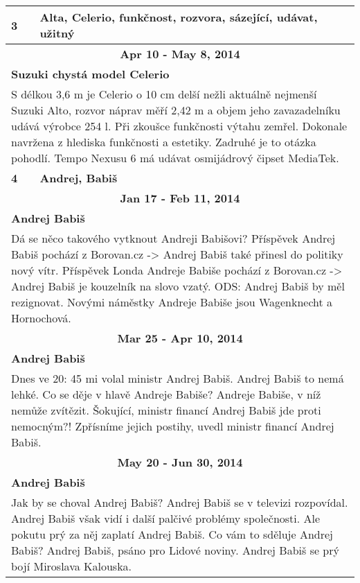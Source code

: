\begin{tabularx}{\linewidth}{l l}
            \bf 3 & \bf Alta, Celerio, funkčnost, rozvora, sázející, udávat, užitný \\ \midrule
            
                \multicolumn{2}{c}{\bf Apr 10 - May 8, 2014} \\
                \multicolumn{2}{p{\linewidth}}{\bf Suzuki chystá model Celerio} \\
                \multicolumn{2}{p{\linewidth}}{S délkou 3,6 m je Celerio o 10 cm delší nežli aktuálně nejmenší Suzuki Alto, rozvor náprav měří 2,42 m a objem jeho zavazadelníku udává výrobce 254 l. Při zkoušce funkčnosti výtahu zemřel. Dokonale navržena z hlediska funkčnosti a estetiky. Zadruhé je to otázka pohodlí. Tempo Nexusu 6 má udávat osmijádrový čipset MediaTek.} \\ \midrule
                [1.5pt]

            \bf 4 & \bf Andrej, Babiš \\ \midrule
            
                \multicolumn{2}{c}{\bf Jan 17 - Feb 11, 2014} \\
                \multicolumn{2}{p{\linewidth}}{\bf Andrej Babiš} \\
                \multicolumn{2}{p{\linewidth}}{Dá se něco takového vytknout Andreji Babišovi? Příspěvek Andrej Babiš pochází z Borovan.cz -> Andrej Babiš také přinesl do politiky nový vítr. Příspěvek Londa Andreje Babiše pochází z Borovan.cz -> Andrej Babiš je kouzelník na slovo vzatý. ODS: Andrej Babiš by měl rezignovat. Novými náměstky Andreje Babiše jsou Wagenknecht a Hornochová.} \\ \midrule
                
                \multicolumn{2}{c}{\bf Mar 25 - Apr 10, 2014} \\
                \multicolumn{2}{p{\linewidth}}{\bf Andrej Babiš} \\
                \multicolumn{2}{p{\linewidth}}{Dnes ve 20: 45 mi volal ministr Andrej Babiš. Andrej Babiš to nemá lehké. Co se děje v hlavě Andreje Babiše? Andreje Babiše, v níž nemůže zvítězit. Šokující, ministr financí Andrej Babiš jde proti nemocným?! Zpřísníme jejich postihy,  uvedl ministr financí Andrej Babiš.} \\ \midrule
                
                \multicolumn{2}{c}{\bf May 20 - Jun 30, 2014} \\
                \multicolumn{2}{p{\linewidth}}{\bf Andrej Babiš} \\
                \multicolumn{2}{p{\linewidth}}{Jak by se choval Andrej Babiš? Andrej Babiš se v televizi rozpovídal. Andrej Babiš však vidí i další palčivé problémy společnosti. Ale pokutu prý za něj zaplatí Andrej Babiš. Co vám to sděluje Andrej Babiš? Andrej Babiš, psáno pro Lidové noviny. Andrej Babiš se prý bojí Miroslava Kalouska.} \\ \midrule
                

\end{tabularx}
